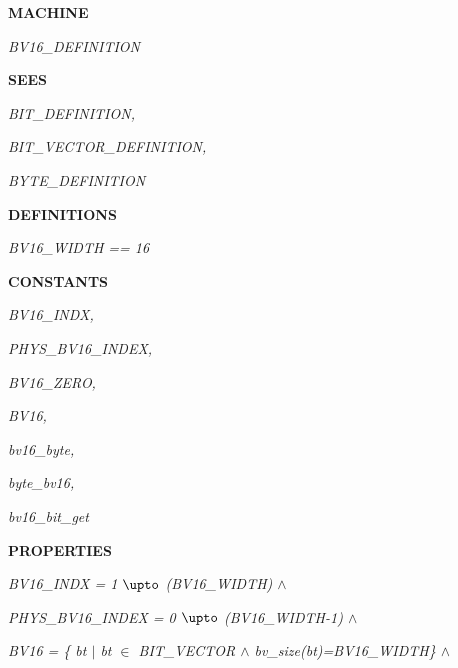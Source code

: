 
 

\bf MACHINE

\hspace*{0.20in}\it BV16\_DEFINITION\hspace*{0.20in}

\bf SEES 

\hspace*{0.20in}\it BIT\_DEFINITION\rm ,

\hspace*{0.20in}\it BIT\_VECTOR\_DEFINITION\rm ,

\hspace*{0.20in}\it BYTE\_DEFINITION

\hspace*{0.20in}

\bf DEFINITIONS\hspace*{0.20in}

\hspace*{0.20in}\it BV16\_WIDTH \rm == \rm 1\rm 6

\hspace*{0.20in}

\bf CONSTANTS 

\hspace*{0.20in}\it BV16\_INDX\rm ,

\hspace*{0.20in}\it PHYS\_BV16\_INDEX\rm ,

\hspace*{0.20in}\it BV16\_ZERO\rm ,

\hspace*{0.20in}\it BV16\rm ,

\hspace*{0.20in}\it bv16\_byte\rm ,

\hspace*{0.20in}\it byte\_bv16\rm ,

\hspace*{0.20in}\it bv16\_bit\_get

\hspace*{0.20in}

\bf PROPERTIES 

\vspace*{4mm}
\hspace*{0.20in}\it BV16\_INDX \rm = \rm 1 $\upto$ \rm (\it BV16\_WIDTH\rm )  $\land$ 

\hspace*{0.20in}\it PHYS\_BV16\_INDEX \rm = \rm 0 $\upto$ \rm (\it BV16\_WIDTH\rm -\rm 1\rm )  $\land$ 

\hspace*{0.20in}\it BV16 \rm = \rm \{ \it bt  $\mid$  \it bt $\in$  \it BIT\_VECTOR  $\land$  \it bv\_size\rm (\it bt\rm )\rm =\it BV16\_WIDTH\rm \}  $\land$ 

